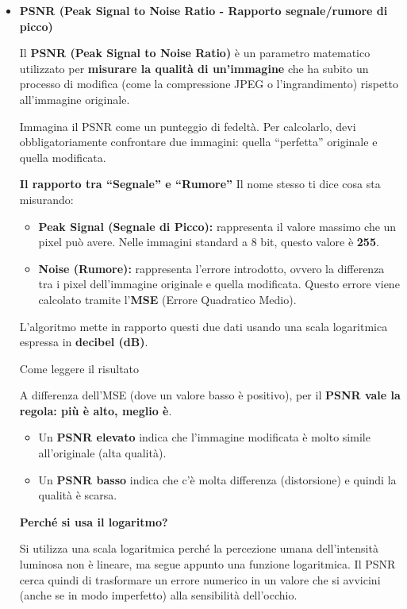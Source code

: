 \begin{itemize}
\item
  \textbf{PSNR (Peak Signal to Noise Ratio - Rapporto segnale/rumore di
  picco)}

  Il \textbf{PSNR (Peak Signal to Noise Ratio)} è un parametro
  matematico utilizzato per \textbf{misurare la qualità di un'immagine}
  che ha subito un processo di modifica (come la compressione JPEG o
  l'ingrandimento) rispetto all'immagine originale.

  Immagina il PSNR come un punteggio di fedeltà. Per calcolarlo, devi
  obbligatoriamente confrontare due immagini: quella ``perfetta''
  originale e quella modificata.

  \textbf{Il rapporto tra ``Segnale'' e ``Rumore''} Il nome stesso ti
  dice cosa sta misurando:

  \begin{itemize}
  \tightlist
  \item
    \textbf{Peak Signal (Segnale di Picco):} rappresenta il valore
    massimo che un pixel può avere. Nelle immagini standard a 8 bit,
    questo valore è \textbf{255}.
  \item
    \textbf{Noise (Rumore):} rappresenta l'errore introdotto, ovvero la
    differenza tra i pixel dell'immagine originale e quella modificata.
    Questo errore viene calcolato tramite l'\textbf{MSE} (Errore
    Quadratico Medio).
  \end{itemize}

  L'algoritmo mette in rapporto questi due dati usando una scala
  logaritmica espressa in \textbf{decibel (dB)}.

  Come leggere il risultato

  A differenza dell'MSE (dove un valore basso è positivo), per il
  \textbf{PSNR vale la regola: più è alto, meglio è}.

  \begin{itemize}
  \tightlist
  \item
    Un \textbf{PSNR elevato} indica che l'immagine modificata è molto
    simile all'originale (alta qualità).
  \item
    Un \textbf{PSNR basso} indica che c'è molta differenza (distorsione)
    e quindi la qualità è scarsa.
  \end{itemize}

  \textbf{Perché si usa il logaritmo?}

  Si utilizza una scala logaritmica perché la percezione umana
  dell'intensità luminosa non è lineare, ma segue appunto una funzione
  logaritmica. Il PSNR cerca quindi di trasformare un errore numerico in
  un valore che si avvicini (anche se in modo imperfetto) alla
  sensibilità dell'occhio.


\end{itemize}
